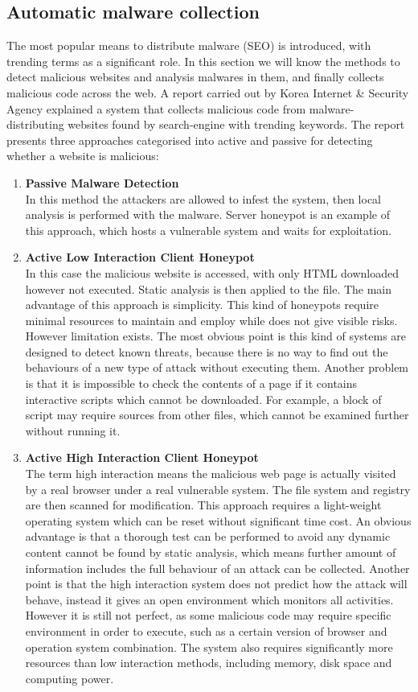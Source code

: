 \subsection{Automatic malware collection}
The most popular means to distribute malware (SEO) is introduced, 
with trending terms as a significant role. In this section we will know the 
methods to detect malicious websites and analysis malwares in them, and 
finally collects malicious code across the web. A report carried out by Korea 
Internet \& Security Agency\cite{automalwarecollecting} explained a system 
that collects malicious code from malware-distributing websites found by 
search-engine with trending keywords. The report presents three approaches 
categorised into active and passive for detecting whether a website is 
malicious: 
\begin{enumerate}
\item 
{\bf Passive Malware Detection}\\
In this method the attackers are allowed to infest the system, then local analysis 
is performed with the malware. Server honeypot is an example of this approach, which hosts 
a vulnerable system and waits for exploitation. 
\item
{\bf Active Low Interaction Client Honeypot}\\
In this case the malicious website is accessed, with only HTML downloaded 
however not executed. Static analysis is then applied to the file. The main 
advantage of this approach is simplicity. This kind of honeypots require 
minimal resources to maintain and employ while does not give visible 
risks.\cite{honeypots}
However limitation exists. The most obvious point is this kind of systems are 
designed to detect known threats, because there is no way to find out the 
behaviours of a new type of attack without executing them. Another problem is 
that it is impossible to check the contents of a page if it contains interactive 
scripts which cannot be downloaded. For example, a block of script may require 
sources from other files, which cannot be examined further without running it. 
\item
{\bf Active High Interaction Client Honeypot}\\
The term high interaction means the malicious web page is actually visited by a 
real browser under a real vulnerable system. 
The file system and registry are then scanned for modification. This approach 
requires a light-weight operating system which can be reset without 
significant time cost. An obvious advantage is that a thorough test can be 
performed to avoid any dynamic content cannot be found by static analysis, 
which means further amount of information includes the 
full behaviour of an attack can be collected. Another point is that the high interaction system 
does not predict how the attack will behave, instead it gives an open 
environment which monitors all activities.\cite{honeypots}
However it is still not perfect, as some malicious code may require specific 
environment in order to execute, such as a certain version of browser and 
operation system combination. The system also requires significantly more 
resources than low interaction methods, including memory, disk space and 
computing power. 
\end{enumerate} 
